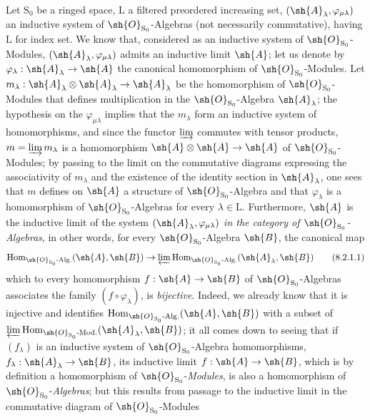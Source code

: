 \begin{env}[8.2.1]
\label{IV.8.2.1}
Let $\mathrm{S}_0$ be a ringed space, $\mathrm{L}$ a filtered preordered increasing set, $(\sh{A}_\lambda,\varphi_{\mu\lambda})$ an inductive system of $\sh{O}_{\mathrm{S}_0}$-Algebras (not necessarily commutative), having $\mathrm{L}$ for index set.
We know that, considered as an inductive system of $\sh{O}_{\mathrm{S}_0}$-Modules, $(\sh{A}_\lambda,\varphi_{\mu\lambda})$ admits an inductive limit $\sh{A}$; let us denote by $\varphi_\lambda:\sh{A}_\lambda\to\sh{A}$ the canonical homomorphism of $\sh{O}_{\mathrm{S}_0}$-Modules.
Let $m_\lambda:\sh{A}_\lambda\otimes\sh{A}_\lambda\to\sh{A}_\lambda$ be the homomorphism of $\sh{O}_{\mathrm{S}_0}$-Modules that defines multiplication in the $\sh{O}_{\mathrm{S}_0}$-Algebra $\sh{A}_\lambda$; the hypothesis on the $\varphi_{\mu\lambda}$ implies that the $m_\lambda$ form an inductive system of homomorphisms,
and since the functor $\varinjlim$ commutes with tensor products, $m=\varinjlim m_\lambda$ is a homomorphism $\sh{A}\otimes\sh{A}\to\sh{A}$ of $\sh{O}_{\mathrm{S}_0}$-Modules; by passing to the limit on the commutative diagrams expressing the associativity of $m_\lambda$ and the existence of the identity section in $\sh{A}_\lambda$, one sees that $m$ defines on $\sh{A}$ a structure of $\sh{O}_{\mathrm{S}_0}$-Algebra and that $\varphi_\lambda$ is a homomorphism of $\sh{O}_{\mathrm{S}_0}$-Algebras for every $\lambda\in\mathrm{L}$.
Furthermore, $\sh{A}$ is the inductive limit of the system $(\sh{A}_\lambda,\varphi_{\mu\lambda})$ \emph{in the category of $\sh{O}_{\mathrm{S}_0}$-Algebras}, in other words, for every $\sh{O}_{\mathrm{S}_0}$-Algebra $\sh{B}$, the canonical map
\begin{equation}
  \operatorname{Hom}_{\sh{O}_{\mathrm{S}_0}\text{-}\mathrm{Alg.}}(\sh{A},\sh{B})\to\varprojlim\operatorname{Hom}_{\sh{O}_{\mathrm{S}_0}\text{-}\mathrm{Alg.}}(\sh{A}_\lambda,\sh{B})
  \tag{8.2.1.1}
\label{IV.8.2.1.1}
\end{equation}
which to every homomorphism $f:\sh{A}\to\sh{B}$ of $\sh{O}_{\mathrm{S}_0}$-Algebras associates the family $(f\circ\varphi_\lambda)$, is \emph{bijective}.
Indeed, we already know that it is injective and identifies $\operatorname{Hom}_{\sh{O}_{\mathrm{S}_0}\text{-}\mathrm{Alg.}}(\sh{A},\sh{B})$ with a subset of $\varprojlim\operatorname{Hom}_{\sh{O}_{\mathrm{S}_0}\text{-}\mathrm{Mod.}}(\sh{A}_\lambda,\sh{B})$; it all comes down to seeing that if $(f_\lambda)$ is an inductive system of $\sh{O}_{\mathrm{S}_0}$-Algebra homomorphisms, $f_\lambda:\sh{A}_\lambda\to\sh{B}$, its inductive limit $f:\sh{A}\to\sh{B}$, which is by definition a homomorphism of $\sh{O}_{\mathrm{S}_0}$-\emph{Modules}, is also a homomorphism of $\sh{O}_{\mathrm{S}_0}$-\emph{Algebras}; but this results from passage to the inductive limit in the commutative diagram of $\sh{O}_{\mathrm{S}_0}$-Modules

\end{env}
